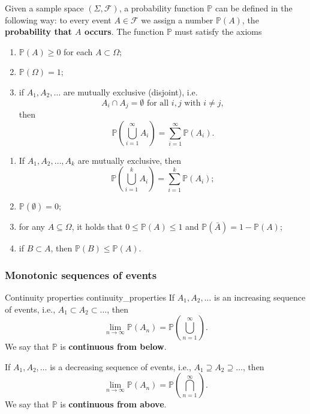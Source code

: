 Given a sample space $(\Sigma, \mathcal{F})$, a probability function $\mathbb{P}$ can be defined in the following way: to every event $A \in \mathcal{F}$ we assign a number $\mathbb{P} (A)$, the \textbf{probability that $A$ occurs}. The function $\mathbb{P}$ must satisfy the axioms

\begin{enumerate}
	\item $\mathbb{P} (A) \geq 0$ for each $A \subset \Omega$;
	\item $\mathbb{P} (\Omega) = 1$;
	\item if $A_1, A_2, \ldots$ are mutually exclusive (disjoint), i.e.
	$$ A_i \cap A_j = \emptyset \text{ for all } i, j \text{ with } i \not = j  ,$$
	then
	$$ \mathbb{P} \left( \bigcup_{i = 1}^{\infty} A_i \right) = \sum_{i = 1}^{\infty} \mathbb{P} (A_i) . $$
\end{enumerate}

\begin{lemma}{\cite{math2901_notes}}{}
\begin{enumerate}
	\item If $A_1, A_2, \ldots, A_k$ are mutually exclusive, then
	$$ \mathbb{P} \left( \bigcup_{i = 1}^{k} A_i \right) = \sum_{i = 1}^{k} \mathbb{P} (A_i) ; $$
	\item $\mathbb{P} (\emptyset) = 0$;
	\item for any $A \subseteq \Omega$, it holds that $0 \leq \mathbb{P} (A) \leq 1$ and $\mathbb{P} (\bar A) = 1 - \mathbb{P} (A)$;
	\item if $B \subset A$, then $\mathbb{P} (B) \leq \mathbb{P} (A)$.
\end{enumerate}
\end{lemma}

\subsubsection{Monotonic sequences of events}

\begin{theorem}{Continuity properties \cite{math2901_notes}}{continuity_properties}
If $A_1, A_2, \ldots$ is an increasing sequence of events, i.e., $A_1 \subset A_2 \subset \dots$, then
$$ \lim_{n \to \infty} \mathbb{P} (A_n) = \mathbb{P} \left( \bigcup_{n = 1}^{\infty} \right) . $$
We say that $\mathbb{P}$ is \textbf{continuous from below}.

If $A_1, A_2, \ldots$ is a decreasing sequence of events, i.e., $A_1 \supseteq A_2 \supseteq \dots$, then
$$ \lim_{n \to \infty} \mathbb{P} (A_n) = \mathbb{P} \left( \bigcap_{n = 1}^{\infty} \right) . $$
We say that $\mathbb{P}$ is \textbf{continuous from above}.
\end{theorem}

